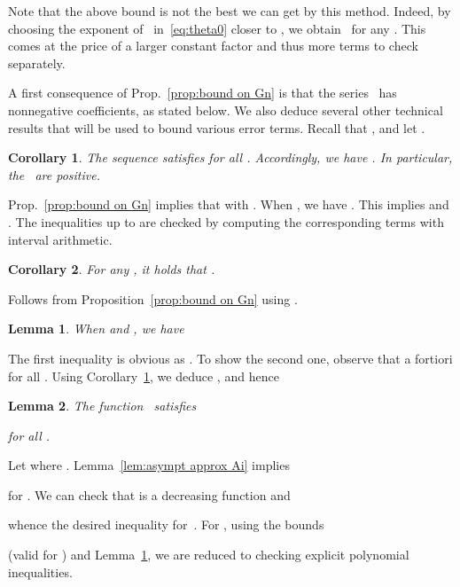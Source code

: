 \documentclass[10pt, conference]{IEEEtran}
\newtheorem{corollary}{Corollary}
\newtheorem{lemma}{Lemma}
\begin{document}
Note that the above bound is not the best we can get by this method.
Indeed, by choosing the exponent of~ in~\eqref{eq:theta0} closer to , we obtain~ for any . This comes at the price of a larger constant factor and thus more terms to check separately.

A first consequence of Prop.~\ref{prop:bound on Gn} is that the series~ has nonnegative coefficients, as stated below.
We also deduce several other technical results that will be used to bound various error terms.
Recall that , and let .

\begin{corollary}
    \label{cor:positivity}  The sequence  satisfies  for all . Accordingly, we have .
    In particular, the~ are positive.
\end{corollary}

\begin{IEEEproof}
 Prop.~\ref{prop:bound on Gn} implies that  with . When , we have . This implies  and
  .
  The inequalities up to  are checked by computing the corresponding terms with interval arithmetic.
\end{IEEEproof}

\begin{corollary} \mightbeomitted
  \label{cor:upper bound on Gn}  For any , it holds that .
\end{corollary}
\begin{IEEEproof}
  Follows from Proposition~\ref{prop:bound on Gn} using .
\end{IEEEproof}

\begin{lemma}
  \label{lem:remainder G}
  When  and , we have

\end{lemma}
\begin{IEEEproof}
  The first inequality is obvious as . To show the second one, observe that a fortiori  for all . Using Corollary~\ref{cor:positivity}, we deduce , and hence 
\end{IEEEproof}

\begin{lemma} \mightbeomitted
  \label{lem:bounds G}The function~ satisfies
  
  for all .
\end{lemma}
\begin{IEEEproof}
Let  where .
  Lemma~\ref{lem:asympt approx Ai} implies
  
  for . We can check that  is a decreasing function and
  
  whence the desired inequality for~.
  For , using the bounds
  
  (valid for ) and Lemma~\ref{lem:remainder G}, we are reduced to checking explicit polynomial inequalities.
\end{IEEEproof}
\end{document}

